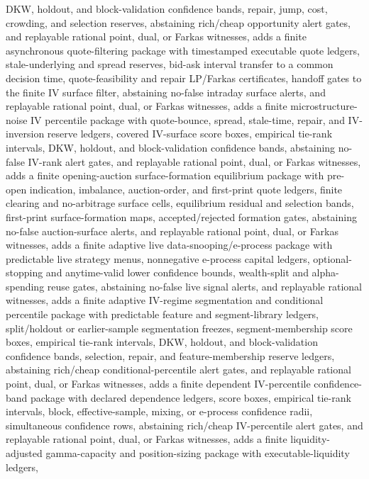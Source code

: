 \documentclass[11pt]{article}
\begin{document}
DKW, holdout, and block-validation confidence bands, repair, jump, cost, crowding, and selection
reserves, abstaining rich/cheap opportunity alert gates, and replayable rational point, dual, or
Farkas witnesses, adds a finite asynchronous quote-filtering package with timestamped executable
quote ledgers, stale-underlying and spread reserves, bid-ask interval transfer to a common decision
time, quote-feasibility and repair LP/Farkas certificates, handoff gates to the finite IV surface
filter, abstaining no-false intraday surface alerts, and replayable rational point, dual, or Farkas
witnesses, adds a finite microstructure-noise IV percentile package with quote-bounce, spread,
stale-time, repair, and IV-inversion reserve ledgers, covered IV-surface score boxes, empirical
tie-rank intervals, DKW, holdout, and block-validation confidence bands, abstaining no-false
IV-rank alert gates, and replayable rational point, dual, or Farkas witnesses, adds a finite
opening-auction surface-formation equilibrium package with pre-open indication, imbalance,
auction-order, and first-print quote ledgers, finite clearing and no-arbitrage surface cells,
equilibrium residual and selection bands, first-print surface-formation maps, accepted/rejected
formation gates, abstaining no-false auction-surface alerts, and replayable rational point, dual, or
Farkas witnesses, adds a finite adaptive live data-snooping/e-process package with predictable live
strategy menus, nonnegative e-process capital ledgers, optional-stopping and anytime-valid lower
confidence bounds, wealth-split and alpha-spending reuse gates, abstaining no-false live signal
alerts, and replayable rational witnesses, adds a finite adaptive IV-regime segmentation and
conditional percentile package with predictable feature and segment-library ledgers, split/holdout or
earlier-sample segmentation freezes, segment-membership score boxes, empirical tie-rank intervals,
DKW, holdout, and block-validation confidence bands, selection, repair, and feature-membership
reserve ledgers, abstaining rich/cheap conditional-percentile alert gates, and replayable rational
point, dual, or Farkas witnesses, adds a finite dependent IV-percentile confidence-band package with
declared dependence ledgers, score boxes, empirical tie-rank intervals, block, effective-sample,
mixing, or e-process confidence radii, simultaneous confidence rows, abstaining rich/cheap
IV-percentile alert gates, and replayable rational point, dual, or Farkas witnesses, adds a finite
liquidity-adjusted gamma-capacity and position-sizing package with executable-liquidity ledgers,
\end{document}
